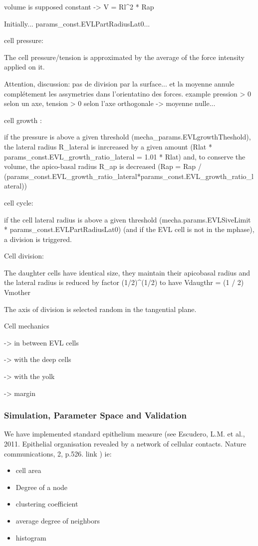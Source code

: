    volume is supposed constant -> V = Rl^2 * Rap  

   Initially... params_const.EVLPartRadiusLat0...  

   cell pressure:  

   The cell pressure/tension is approximated by the average of the force intensity applied on it.  

   Attention, discussion: pas de division par la surface... et la moyenne annule complétement les assymetries dans l'orientatino des forces. example pression > 0 selon un axe, tension > 0 selon l'axe orthogonale -> moyenne nulle...  

   cell growth :  

   if the pressure is above a given threshold (mecha_params.EVLgrowthTheshold), the lateral radius R_lateral is inrcreased by a given amount (Rlat * params_const.EVL_growth_ratio_lateral = 1.01 * Rlat) and, to conserve the volume, the apico-basal radius R_ap is decreased (Rap = Rap / (params_const.EVL_growth_ratio_lateral*params_const.EVL_growth_ratio_lateral))  

   cell cycle:  

   if the cell lateral radius is above a given threshold (mecha.params.EVLSiveLimit * params_const.EVLPartRadiusLat0) (and if the EVL cell is not in the mphase), a division is triggered.   

   Cell division:  

   The daughter cells have identical size, they maintain their apicobasal radius and the lateral radius is reduced by factor (1/2)^(1/2) to have Vdaugthr = (1 / 2) Vmother  

   The axis of division is selected random in the tangential plane.  

   Cell mechanics  

   -> in between EVL cells  

   -> with the deep cells  

   -> with the yolk  

   -> margin   

\subsubsection{Simulation, Parameter Space and Validation }

   We have implemented standard epithelium measure (see Escudero, L.M. et al., 2011. Epithelial organisation revealed by a network of cellular contacts. Nature communications, 2, p.526. link \cite{Escudero:2011cv}) ie:  
\begin{itemize}
	\item cell area
	\item Degree of a node
	\item clustering coefficient
	\item average degree of neighbors
	\item histogram
\end{itemize}

